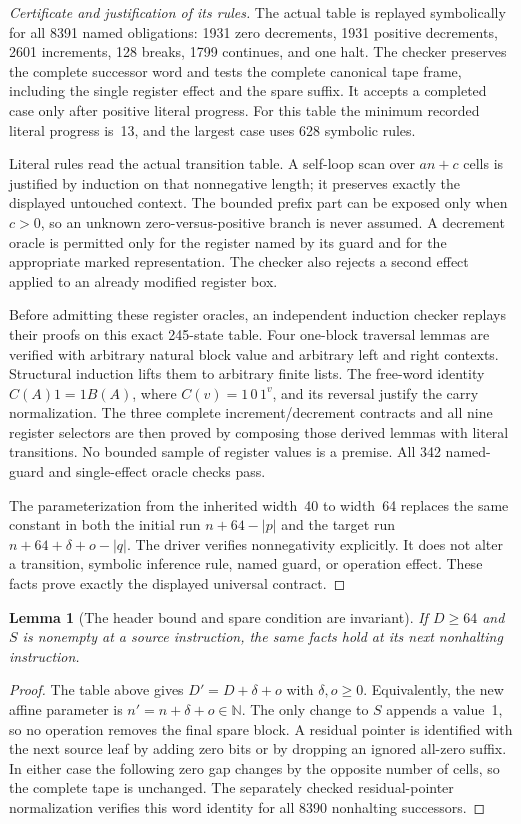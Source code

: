 \documentclass[11pt]{article}
\newtheorem{lemma}{Lemma}
\begin{document}
\begin{proof}[Certificate and justification of its rules]
The actual table is replayed symbolically for all 8391 named obligations:
1931 zero decrements, 1931 positive decrements, 2601 increments,
128 breaks, 1799 continues, and one halt. The checker preserves the complete
successor word and tests the complete canonical tape frame, including the
single register effect and the spare suffix. It accepts a completed case only
after positive literal progress. For this table the minimum recorded literal
progress is~13, and the largest case uses 628 symbolic rules.

Literal rules read the actual transition table. A self-loop scan over
$a n+c$ cells is justified by induction on that nonnegative length; it
preserves exactly the displayed untouched context. The bounded prefix part
can be exposed only when $c>0$, so an unknown zero-versus-positive branch is
never assumed. A decrement oracle is permitted only for the register named
by its guard and for the appropriate marked representation. The checker
also rejects a second effect applied to an already modified register box.

Before admitting these register oracles, an independent induction checker
replays their proofs on this exact 245-state table. Four one-block traversal
lemmas are verified with arbitrary natural block value and arbitrary left
and right contexts. Structural induction lifts them to arbitrary finite
lists. The free-word identity
$C(A)1=1B(A)$, where $C(v)=1\,0\,1^v$, and its reversal justify the carry
normalization. The three complete increment/decrement contracts and all nine
register selectors are then proved by composing those derived lemmas with
literal transitions. No bounded sample of register values is a premise.
All 342 named-guard and single-effect oracle checks pass.

The parameterization from the inherited width~40 to width~64 replaces the
same constant in both the initial run $n+64-|p|$ and the target run
$n+64+\delta+o-|q|$. The driver verifies nonnegativity explicitly. It does
not alter a transition, symbolic inference rule, named guard, or operation
effect. These facts prove exactly the displayed universal contract.
\end{proof}

\begin{lemma}[The header bound and spare condition are invariant]
If $D\geq64$ and $S$ is nonempty at a source instruction, the same facts
hold at its next nonhalting instruction.
\end{lemma}
\begin{proof}
The table above gives $D'=D+\delta+o$ with $\delta,o\geq0$. Equivalently,
the new affine parameter is $n'=n+\delta+o\in\mathbb N$. The only change
to $S$ appends a value~1, so no operation removes the final spare block.
A residual pointer is identified with the next source leaf by adding zero
bits or by dropping an ignored all-zero suffix. In either case the following
zero gap changes by the opposite number of cells, so the complete tape is
unchanged. The separately checked residual-pointer normalization verifies
this word identity for all 8390 nonhalting successors.
\end{proof}
\end{document}
